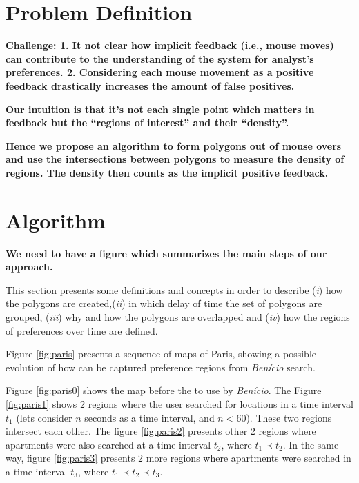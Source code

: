 \documentclass[runningheads,a4paper]{llncs}
\begin{document}
\section{Problem Definition}
{\bf Challenge: 1. It not clear how implicit feedback (i.e., mouse moves) can contribute to the understanding of the system for analyst’s preferences. 2. Considering each mouse movement as a positive feedback drastically increases the amount of false positives.}

\vspace{3pt}
{\bf Our intuition is that it’s not each single point which matters in feedback but the “regions of interest” and their “density”.}

\vspace{3pt}
{\bf Hence we propose an algorithm to form polygons out of mouse overs and use the intersections between polygons to measure the density of regions. The density then counts as the implicit positive feedback.}

\section{Algorithm}
\label{sec:overpolygons}

{\bf We need to have a figure which summarizes the main steps of our approach.}

\vspace{3pt}
This section presents some definitions and concepts in order to describe (\textit{i}) how the polygons are created,(\textit{ii}) in which delay of time the set of polygons are grouped, (\textit{iii})  why and how the polygons are overlapped and  (\textit{iv}) how the regions of preferences over time are defined.

\vspace{3pt}
Figure \ref{fig:paris} presents a sequence of maps of Paris, showing a possible  evolution of how can be captured preference regions from \textit{Ben\'icio} search.

Figure \ref{fig:paris0} shows the map before the to use by  \textit{Ben\'icio}. The Figure \ref{fig:paris1} shows 2 regions where the user searched for locations in a time interval $t_1$ (lets consider $n$ seconds as a time interval, and $n < 60$). These two regions intersect each other. The figure \ref{fig:paris2} presents other 2 regions where apartments were also searched at a time interval $t_2$, where $t_1 \prec t_2$. In the same way, figure \ref{fig:paris3}  presents 2 more regions where apartments were searched in a time interval $t_3$, where $t_1 \prec t_2 \prec t_ 3$.
\end{document}
